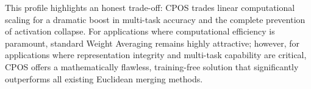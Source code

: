 \documentclass{article}
\theoremstyle{plain}
\theoremstyle{definition}
\theoremstyle{remark}
\begin{document}
This profile highlights an honest trade-off: CPOS trades linear computational scaling for a dramatic boost in multi-task accuracy and the complete prevention of activation collapse. For applications where computational efficiency is paramount, standard Weight Averaging remains highly attractive; however, for applications where representation integrity and multi-task capability are critical, CPOS offers a mathematically flawless, training-free solution that significantly outperforms all existing Euclidean merging methods.
\end{document}
